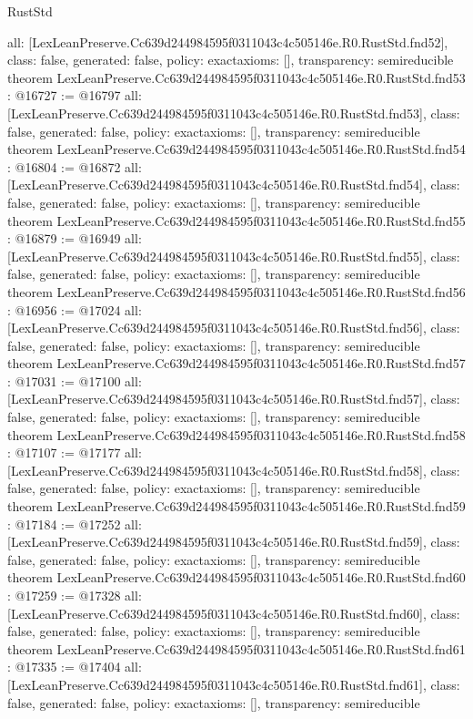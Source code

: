 \begin{lexlean}{RustStd}
\begin{coremodule}
{  all: [LexLeanPreserve.Cc639d244984595f0311043c4c505146e.R0.RustStd.fnd52],
  class: false,
  generated: false,
  policy: exact{axioms: []},
  transparency: semireducible
}
theorem LexLeanPreserve.Cc639d244984595f0311043c4c505146e.R0.RustStd.fnd53 : @16727 := @16797 {
  all: [LexLeanPreserve.Cc639d244984595f0311043c4c505146e.R0.RustStd.fnd53],
  class: false,
  generated: false,
  policy: exact{axioms: []},
  transparency: semireducible
}
theorem LexLeanPreserve.Cc639d244984595f0311043c4c505146e.R0.RustStd.fnd54 : @16804 := @16872 {
  all: [LexLeanPreserve.Cc639d244984595f0311043c4c505146e.R0.RustStd.fnd54],
  class: false,
  generated: false,
  policy: exact{axioms: []},
  transparency: semireducible
}
theorem LexLeanPreserve.Cc639d244984595f0311043c4c505146e.R0.RustStd.fnd55 : @16879 := @16949 {
  all: [LexLeanPreserve.Cc639d244984595f0311043c4c505146e.R0.RustStd.fnd55],
  class: false,
  generated: false,
  policy: exact{axioms: []},
  transparency: semireducible
}
theorem LexLeanPreserve.Cc639d244984595f0311043c4c505146e.R0.RustStd.fnd56 : @16956 := @17024 {
  all: [LexLeanPreserve.Cc639d244984595f0311043c4c505146e.R0.RustStd.fnd56],
  class: false,
  generated: false,
  policy: exact{axioms: []},
  transparency: semireducible
}
theorem LexLeanPreserve.Cc639d244984595f0311043c4c505146e.R0.RustStd.fnd57 : @17031 := @17100 {
  all: [LexLeanPreserve.Cc639d244984595f0311043c4c505146e.R0.RustStd.fnd57],
  class: false,
  generated: false,
  policy: exact{axioms: []},
  transparency: semireducible
}
theorem LexLeanPreserve.Cc639d244984595f0311043c4c505146e.R0.RustStd.fnd58 : @17107 := @17177 {
  all: [LexLeanPreserve.Cc639d244984595f0311043c4c505146e.R0.RustStd.fnd58],
  class: false,
  generated: false,
  policy: exact{axioms: []},
  transparency: semireducible
}
theorem LexLeanPreserve.Cc639d244984595f0311043c4c505146e.R0.RustStd.fnd59 : @17184 := @17252 {
  all: [LexLeanPreserve.Cc639d244984595f0311043c4c505146e.R0.RustStd.fnd59],
  class: false,
  generated: false,
  policy: exact{axioms: []},
  transparency: semireducible
}
theorem LexLeanPreserve.Cc639d244984595f0311043c4c505146e.R0.RustStd.fnd60 : @17259 := @17328 {
  all: [LexLeanPreserve.Cc639d244984595f0311043c4c505146e.R0.RustStd.fnd60],
  class: false,
  generated: false,
  policy: exact{axioms: []},
  transparency: semireducible
}
theorem LexLeanPreserve.Cc639d244984595f0311043c4c505146e.R0.RustStd.fnd61 : @17335 := @17404 {
  all: [LexLeanPreserve.Cc639d244984595f0311043c4c505146e.R0.RustStd.fnd61],
  class: false,
  generated: false,
  policy: exact{axioms: []},
  transparency: semireducible
}
\end{coremodule}
\end{lexlean}
